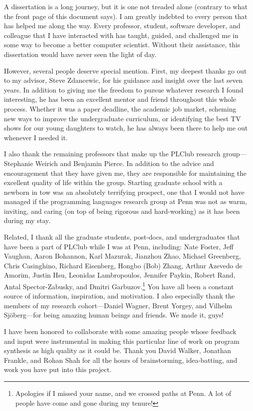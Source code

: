 A dissertation is a long journey, but it is one not treaded alone (contrary to what the front page of this document says).
I am greatly indebted to every person that has helped me along the way.
Every professor, student, software developer, and colleague that I have interacted with has taught, guided, and challenged me in some way to become a better computer scientist.
Without their assistance, this dissertation would have never seen the light of day.

However, several people deserve special mention.
First, my deepest thanks go out to my advisor, Steve Zdancewic, for his guidance and insight over the last seven years.
In addition to giving me the freedom to pursue whatever research I found interesting, he has been an excellent mentor and friend throughout this whole process.
Whether it was a paper deadline, the academic job market, scheming new ways to improve the undergraduate curriculum, or identifying the best TV shows for our young daughters to watch, he has always been there to help me out whenever I needed it.

I also thank the remaining professors that make up the PLClub research group---Stephanie Weirich and Benjamin Pierce.
In addition to the advice and encouragement that they have given me, they are responsible for maintaining the excellent quality of life within the group.
Starting graduate school with a newborn in tow was an absolutely terrifying prospect, one that I would not have managed if the programming languages research group at Penn was not as warm, inviting, and caring (on top of being rigorous and hard-working) as it has been during my stay.

Related, I thank all the graduate students, post-docs, and undergraduates that have been a part of PLClub while I was at Penn, including: Nate Foster, Jeff Vaughan, Aaron Bohannon, Karl Mazurak, Jianzhou Zhao, Michael Greenberg, Chris Casinghino, Richard Eisenberg, Hongbo (Bob) Zhang, Arthur Azevedo de Amorim, Justin Hsu, Leonidas Lambropoulos, Jennifer Paykin, Robert Rand, Antal Spector-Zabusky, and Dmitri Garbuzov.\footnote{%
  Apologies if I missed your name, and we crossed paths at Penn.
  A lot of people have come and gone during my tenure!
}
You have all been a constant source of information, inspiration, and motivation.
I also especially thank the members of my research cohort---Daniel Wagner, Brent Yorgey, and Vilhelm Sj\"{o}berg---for being amazing human beings and friends.
We made it, guys!

I have been honored to collaborate with some amazing people whose feedback and input were instrumental in making this particular line of work on program synthesis as high quality as it could be.
Thank you David Walker, Jonathan Frankle, and Rohan Shah for all the hours of brainstorming, idea-batting, and work you have put into this project.

